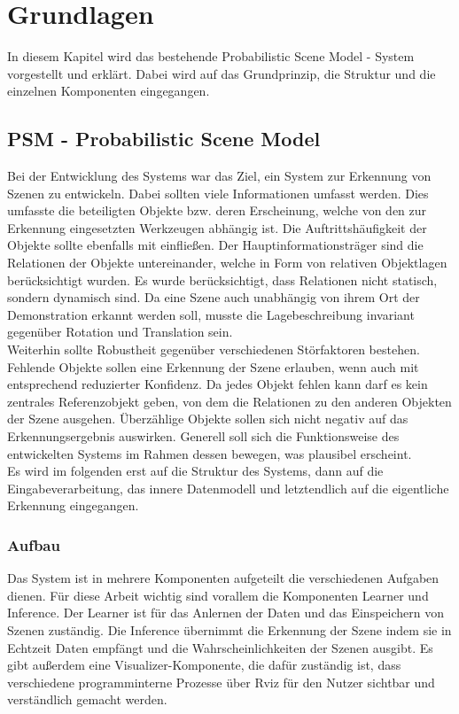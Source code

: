 \chapter{Grundlagen}\label{ch:grundlagen}
In diesem Kapitel wird das bestehende Probabilistic Scene Model - System vorgestellt und erklärt. Dabei wird auf das Grundprinzip, die Struktur und die einzelnen Komponenten eingegangen.
\section{PSM - Probabilistic Scene Model}
Bei der Entwicklung des Systems war das Ziel, ein System zur Erkennung von Szenen zu entwickeln. Dabei sollten viele Informationen umfasst werden. Dies umfasste die beteiligten Objekte bzw. deren Erscheinung, welche von den zur Erkennung eingesetzten Werkzeugen abhängig ist. Die Auftrittshäufigkeit der Objekte sollte ebenfalls mit einfließen. Der Hauptinformationsträger sind die Relationen der Objekte untereinander, welche in Form von relativen Objektlagen berücksichtigt wurden. Es wurde berücksichtigt, dass Relationen nicht statisch, sondern dynamisch sind. Da eine Szene auch unabhängig von ihrem Ort der Demonstration erkannt werden soll, musste die Lagebeschreibung invariant gegenüber Rotation und Translation sein.\smallskip\\
Weiterhin sollte Robustheit gegenüber verschiedenen Störfaktoren bestehen. Fehlende Objekte sollen eine Erkennung der Szene erlauben, wenn auch mit entsprechend reduzierter Konfidenz. Da jedes Objekt fehlen kann darf es kein zentrales Referenzobjekt geben, von dem die Relationen zu den anderen Objekten der Szene ausgehen. Überzählige Objekte sollen sich nicht negativ auf das Erkennungsergebnis auswirken. Generell soll sich die Funktionsweise des entwickelten Systems im Rahmen dessen bewegen, was plausibel erscheint.\smallskip\\
Es wird im folgenden erst auf die Struktur des Systems, dann auf die Eingabeverarbeitung, das innere Datenmodell und letztendlich auf die eigentliche Erkennung eingegangen.
\begin{deprecated}
\cite{gehrung14}
\end{deprecated}
\subsection{Aufbau}
Das System ist in mehrere Komponenten aufgeteilt die verschiedenen Aufgaben dienen. Für diese Arbeit wichtig sind vorallem die Komponenten Learner und Inference. Der Learner ist für das Anlernen der Daten und das Einspeichern von Szenen zuständig. Die Inference übernimmt die Erkennung der Szene indem sie in Echtzeit Daten empfängt und die Wahrscheinlichkeiten der Szenen ausgibt. Es gibt außerdem eine Visualizer-Komponente, die dafür zuständig ist, dass verschiedene programminterne Prozesse über Rviz für den Nutzer sichtbar und verständlich gemacht werden.
